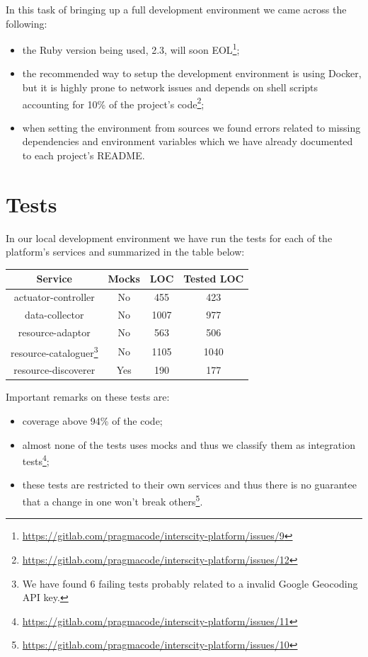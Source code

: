 \documentclass[paper=a4, fontsize=11pt]{scrartcl}
\numberwithin{equation}{section}    %
\numberwithin{figure}{section}      %
\numberwithin{table}{section}        %
\begin{document}
  In this task of bringing up a full development environment we came across the following:

  \begin{itemize}
    \item the Ruby version being used, 2.3, will soon EOL\footnote{\url{https://gitlab.com/pragmacode/interscity-platform/issues/9}};
    \item the recommended way to setup the development environment is using Docker, but it is highly prone to network issues and depends on shell scripts accounting for 10\% of the project's code\footnote{\url{https://gitlab.com/pragmacode/interscity-platform/issues/12}};
    \item when setting the environment from sources we found errors related to missing dependencies and environment variables which we have already documented to each project's README.
  \end{itemize}

\section{Tests}
  In our local development environment we have run the tests for each of the platform's services and summarized in the table below:

  \vspace{1em}

  \begin{center}
    \begin{tabu} to \textwidth {  c | c | c | c  }
      \textbf{Service} & \textbf{Mocks} & \textbf{LOC} & \textbf{Tested LOC} \\ \hline \hline
      actuator-controller & No & 455 & 423 \\
      data-collector & No & 1007 & 977 \\
      resource-adaptor & No & 563 & 506 \\
      resource-cataloguer\footnote{We have found 6 failing tests probably related to a invalid Google Geocoding API key.} & No & 1105 & 1040 \\
      resource-discoverer & Yes & 190 & 177 \\
    \end{tabu}
  \end{center}

  \vspace{1em}

  Important remarks on these tests are:

  \begin{itemize}
    \item coverage above 94\% of the code;
    \item almost none of the tests uses mocks and thus we classify them as integration tests\footnote{\url{https://gitlab.com/pragmacode/interscity-platform/issues/11}};
    \item these tests are restricted to their own services and thus there is no guarantee that a change in one won't break others\footnote{\url{https://gitlab.com/pragmacode/interscity-platform/issues/10}}.
  \end{itemize}
\end{document}
